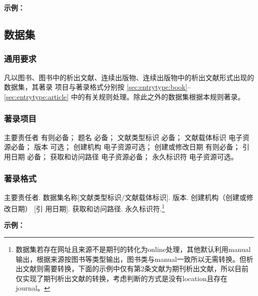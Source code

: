 \documentclass[twoside]{article}%
\begin{document}
\begin{refsection}
\nocite{胡健民2021--,刘祥沈2016地图,中工武大2019地图,吴自银2019地图,国家测绘2016地图,
訾冬梅2006地图,谭其骧1982地图,童世亨1926地图,CRIBB2015map}


\textbf{示例：}

{\printbibliography[heading=none,env=indentegenv]}

\end{refsection}


\subsection{数据集}\label{sec:entrytype:dataset}

\subsubsection{通用要求}

凡以图书、图书中的析出文献、连续出版物、连续出版物中的析出文献形式出现的数据集，其著录
项目与著录格式分别按 \ref{sec:entrytype:book}--\ref{sec:entrytype:article} 中的有关规则处理。除此之外的数据集根据本规则著录。

\subsubsection{著录项目}

主要责任者 有则必备；
题名 必备；
文献类型标识 必备；
文献载体标识 电子资源必备；
版本 可选；
创建机构 电子资源可选；
创建或修改日期 有则必备；
引用日期 必备；
获取和访问路径 电子资源必备；
永久标识符 电子资源可选。

\subsubsection{著录格式}
主要责任者. 数据集名称[文献类型标识/文献载体标识]. 版本. 创建机构（创建或修改日期） [引
用日期]. 获取和访问路径. 永久标识符.\footnote{数据集若存在网址且来源不是期刊的转化为online处理，其他默认利用manual输出，根据来源按图书等类型输出，图书类与manual一致所以无需转换。但析出文献则需要转换，下面的示例中仅有第2条文献为期刊析出文献，所以目前仅实现了期刊析出文献的转换，考虑判断的方式是没有location且存在journal。}

\begin{refsection}

\nocite{草地数据1994--,李皓2024语料库,彭守璋2024降水,刘时银2012水川,仲晓雅2022夜间灯光,仲晓雅2022夜间灯光en,IHME2021Disease,郑涵2018生态}


\textbf{示例：}

{\printbibliography[heading=none,env=indentegenv]}

\end{refsection}
\end{document}
